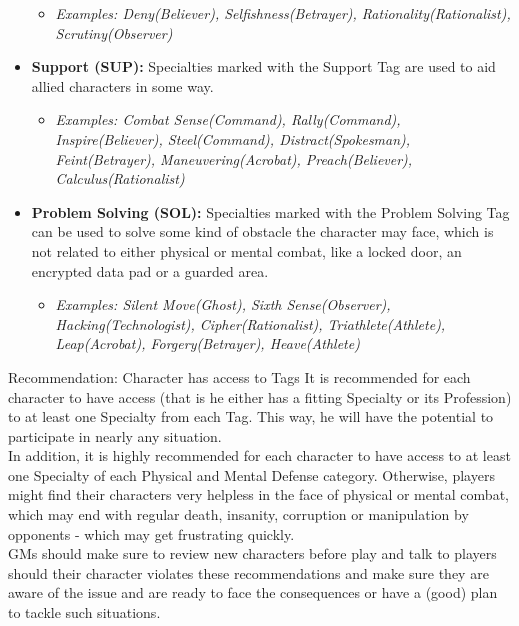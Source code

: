 \begin{itemize}
	\begin{itemize}
		\item \textit{Examples: Deny(Believer), Selfishness(Betrayer), Rationality(Rationalist), Scrutiny(Observer)}
	\end{itemize}
	\item \textbf{Support (SUP):} Specialties marked with the Support Tag are used to aid allied characters in some way.
	\begin{itemize}
		\item \textit{Examples: Combat Sense(Command), Rally(Command), Inspire(Believer), Steel(Command), Distract(Spokesman), Feint(Betrayer), Maneuvering(Acrobat), Preach(Believer), Calculus(Rationalist)}
	\end{itemize}
	\item \textbf{Problem Solving (SOL):} Specialties marked with the Problem Solving Tag can be used to solve some kind of obstacle the character may face, which is not related to either physical or mental combat, like a locked door, an encrypted data pad or a guarded area.
	\begin{itemize}
		\item \textit{Examples: Silent Move(Ghost), Sixth Sense(Observer), Hacking(Technologist), Cipher(Rationalist), Triathlete(Athlete), Leap(Acrobat), Forgery(Betrayer), Heave(Athlete)}
	\end{itemize}
\end{itemize}

\begin{DndSidebar}{Recommendation: Character has access to Tags}
It is recommended for each character to have access (that is he either has a fitting Specialty or its Profession) to at least one Specialty from each Tag. 
This way, he will have the potential to participate in nearly any situation.\\
In addition, it is highly recommended for each character to have access to at least one Specialty of each Physical and Mental Defense category.
Otherwise, players might find their characters very helpless in the face of physical or mental combat, which may end with regular death, insanity, corruption or manipulation by opponents - which may get frustrating quickly.\\
GMs should make sure to review new characters before play and talk to players should their character violates these recommendations and make sure they are aware of the issue and are ready to face the consequences or have a (good) plan to tackle such situations.
\end{DndSidebar}

